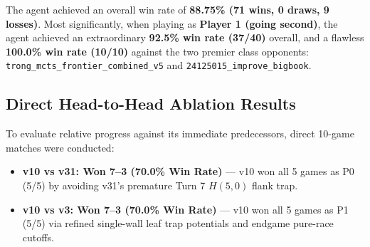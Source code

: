 \begin{table}[htbp]
\centering
\small
\renewcommand{\arraystretch}{1.2}
\caption{Official tournament gauntlet performance across 8 elite opponents}
\label{tab:gauntlet}
\end{table}

The agent achieved an overall win rate of \textbf{88.75\% (71 wins, 0 draws, 9 losses)}. Most significantly, when playing as \textbf{Player 1 (going second)}, the agent achieved an extraordinary \textbf{92.5\% win rate (37/40)} overall, and a flawless \textbf{100.0\% win rate (10/10)} against the two premier class opponents: \texttt{trong\_mcts\_frontier\_combined\_v5} and \texttt{24125015\_improve\_bigbook}.

\subsection{Direct Head-to-Head Ablation Results}
To evaluate relative progress against its immediate predecessors, direct 10-game matches were conducted:
\begin{itemize}[leftmargin=1.5em]
    \item \textbf{v10 vs v31: Won 7--3 (70.0\% Win Rate)} --- v10 won all 5 games as P0 (5/5) by avoiding v31's premature Turn 7 $H(5,0)$ flank trap.
    \item \textbf{v10 vs v3: Won 7--3 (70.0\% Win Rate)} --- v10 won all 5 games as P1 (5/5) via refined single-wall leaf trap potentials and endgame pure-race cutoffs.
\end{itemize}

